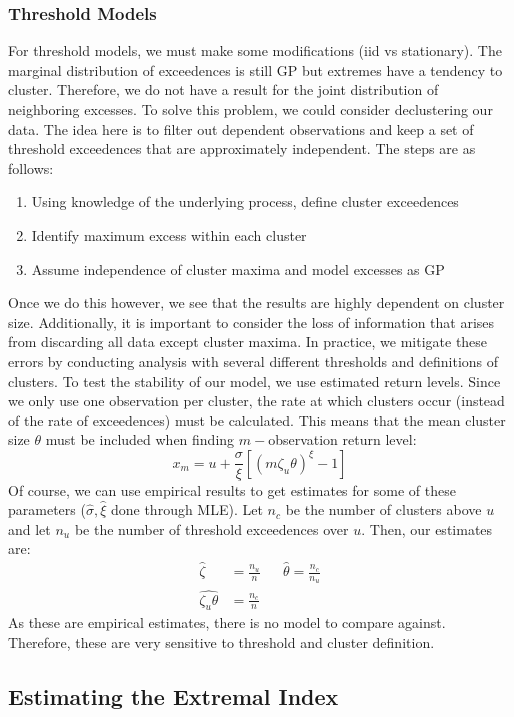 \documentclass{article}
\theoremstyle{definition}
\theoremstyle{definition}
\begin{document}
\subsubsection{Threshold Models}
For threshold models, we must make some modifications (iid vs stationary). The marginal distribution of exceedences is still GP but extremes have a tendency to cluster. Therefore, we do not have a result for the joint distribution of neighboring excesses. To solve this problem, we could consider declustering our data. The idea here is to filter out dependent observations and keep a set of threshold exceedences that are approximately independent. The steps are as follows:
\begin{enumerate}
    \item Using knowledge of the underlying process, define cluster exceedences
    \item Identify maximum excess within each cluster
    \item Assume independence of cluster maxima and model
excesses as GP
\end{enumerate}
Once we do this however, we see that the results are highly dependent on cluster size. Additionally, it is important to consider the loss of information that arises from discarding all data except cluster maxima. In practice, we mitigate these errors by conducting analysis with several different thresholds and definitions of clusters. To test the stability of our model, we use estimated return levels. Since we only use one observation per cluster, the rate at which clusters occur (instead of the rate of exceedences) must be calculated. This means that the mean cluster size $\theta$ must be included when finding $m-$observation return level:
\[x_m= u+\frac{\sigma}{\xi}[(m\zeta_u\theta)^\xi-1]\]
Of course, we can use empirical results to get estimates for some of these parameters ($\hat{\sigma}, \hat{\xi}$ done through MLE). Let $n_c$ be the number of clusters above $u$ and let $n_u$ be the number of threshold exceedences over $u$. Then, our estimates are:
\begin{align*}
\hat{\zeta}&= \frac{n_u}{n} && \hat{\theta}= \frac{n_c}{n_u}\\
\widehat{\zeta_u\theta}&=\frac{n_c}{n}
\end{align*}
As these are empirical estimates, there is no model to compare against. Therefore, these are very sensitive to threshold and cluster definition.
\subsection{Estimating the Extremal Index}
\end{document}
